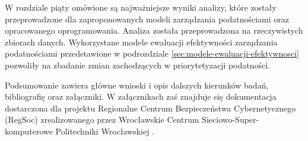 \bigbreak
W rozdziale piąty omówione są najważniejsze wyniki analizy, które zostały przeprowadzone dla zaproponowanych modeli zarządzania podatnościami oraz opracowanego oprogramowania. Analiza została przeprowadzona na rzeczywistych zbiorach danych. Wykorzystane modele ewaluacji efektywności zarządzania podatnościami przedstawione w podrozdziale \ref{sec:modele-ewaluacji-efektywnosci} pozwoliły na zbadanie zmian zachodzących w priorytetyzacji podatności.

\bigbreak
Podsumowanie zawiera główne wnioski i opis dalszych kierunków badań, bibliografię oraz załączniki. W załącznikach zaś znajduje się dokumentacja dostarczona dla projektu Regionalne Centrum Bezpieczeństwa Cybernetycznego (RegSoc) zrealizowanego przez Wrocławskie Centrum Sieciowo-Super-komputerowe Politechniki Wrocławskiej \cite{regsoc}.